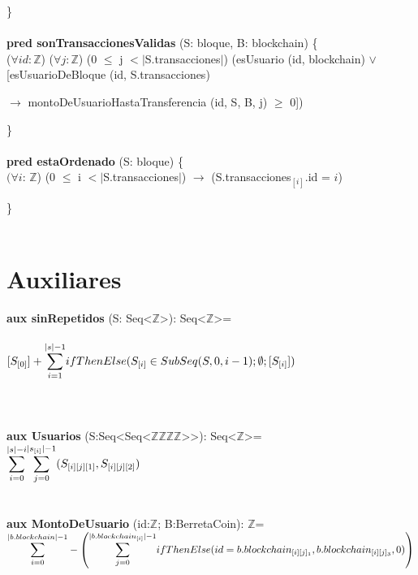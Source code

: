 \documentclass{article}
\newcommand{\Entero}{$\mathds{Z}$}
\newcommand{\tuplaDeTuplaDeCuatroEnteros}{{Seq\textless Seq\textless\Entero\texttimes\Entero\texttimes\Entero\texttimes\Entero\textgreater\textgreater}}
\begin{document}
    \}\\\\

    \textbf{pred sonTransaccionesValidas} (S: bloque, B: blockchain) \{\\
        \indent\indent ($\forall id:$\Entero) ($\forall j:$\Entero) (0 $\le$ j $<|$S.transacciones$|$) (esUsuario (id, blockchain) $\lor$ [esUsuarioDeBloque (id, S.transacciones)
        
        \indent\indent\indent\indent\indent\indent\indent $\rightarrow$ montoDeUsuarioHastaTransferencia (id, S, B, j) $\ge$ 0])

    \}\\\\


    \textbf{pred estaOrdenado} (S: bloque) \{\\
        \indent\indent $(\forall i$: \Entero) (0 $\le$ i $< |$S.transacciones$|$) $\rightarrow$ (S.transacciones$_{[i]}$.id = $i$)

    \}\\\\
\newpage
\section*{Auxiliares}

    \textbf{aux sinRepetidos} (S: Seq\textless$\mathds{Z}$\textgreater): Seq\textless$\mathds{Z}$\textgreater =\\\\
        \indent\indent $[S_{[0]}] + \mathlarger\sum\limits_{i=1}^{|s|-1} ifThenElse(S_{[i]} \in SubSeq(S, 0, i-1); \emptyset; [S_{[i]}])$ \\\\\\\\

    \textbf{aux Usuarios} (S:\tuplaDeTuplaDeCuatroEnteros): Seq\textless$\mathds{Z}$\textgreater=\\

    \indent\indent $\mathlarger\sum\limits_{i=0}^{|s|-i} \mathlarger\sum\limits_{j=0}^{|s_{[i]}|-1} (S_{[i][j][1]}, S_{[i][j][2]})$\\\\\\

    \textbf{aux MontoDeUsuario} (id:\Entero; B:BerretaCoin): \Entero=\\

        \indent\indent
        $\mathlarger\sum\limits_{i=0}^{|b.blockchain| - 1} - \left(
        \mathlarger\sum\limits_{j=0}^{|b.blockchain_{[i]}|-1} ifThenElse (id = b.blockchain_{[i][j]_1}, b.blockchain_{[i][j]_3}, 0)\right)$\\
\end{document}
